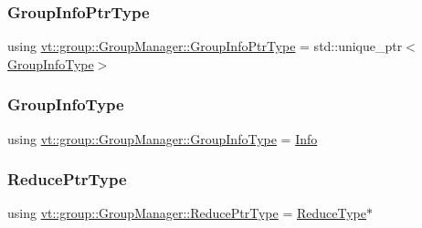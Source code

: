 \subsubsection{\texorpdfstring{Group\+Info\+Ptr\+Type}{GroupInfoPtrType}}
{\footnotesize\ttfamily using \hyperlink{structvt_1_1group_1_1_group_manager_adedebd6e550efd2bee5bb118f816b2e0}{vt\+::group\+::\+Group\+Manager\+::\+Group\+Info\+Ptr\+Type} =  std\+::unique\+\_\+ptr$<$\hyperlink{structvt_1_1group_1_1_group_manager_a556f65e569f3e3f2dfc4a247e137b409}{Group\+Info\+Type}$>$}

\mbox{\label{structvt_1_1group_1_1_group_manager_a556f65e569f3e3f2dfc4a247e137b409}} 
\subsubsection{\texorpdfstring{Group\+Info\+Type}{GroupInfoType}}
{\footnotesize\ttfamily using \hyperlink{structvt_1_1group_1_1_group_manager_a556f65e569f3e3f2dfc4a247e137b409}{vt\+::group\+::\+Group\+Manager\+::\+Group\+Info\+Type} =  \hyperlink{structvt_1_1group_1_1_info}{Info}}

\mbox{\label{structvt_1_1group_1_1_group_manager_a0c646983506b624ad93ceb127df9e811}} 
\subsubsection{\texorpdfstring{Reduce\+Ptr\+Type}{ReducePtrType}}
{\footnotesize\ttfamily using \hyperlink{structvt_1_1group_1_1_group_manager_a0c646983506b624ad93ceb127df9e811}{vt\+::group\+::\+Group\+Manager\+::\+Reduce\+Ptr\+Type} =  \hyperlink{structvt_1_1group_1_1_group_manager_a28113adbc42622f7cf278fcaed4efefa}{Reduce\+Type}$\ast$}

\mbox{\label{structvt_1_1group_1_1_group_manager_a28113adbc42622f7cf278fcaed4efefa}} 
